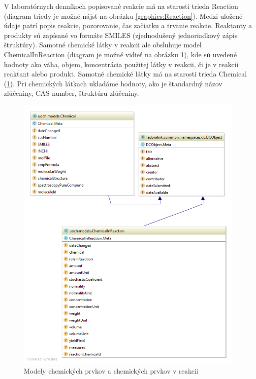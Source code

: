 \documentclass[thesis=M,slovak]{FITthesis}[2013/05/06]
\begin{document}
V laboratórnych denníkoch popisované reakcie má na starosti trieda Reaction (diagram triedy je možné nájsť na obrázku \ref{graphics:Reaction}). Medzi uložené údaje patrí popis reakcie, pozorovanie, čas začiatku a trvanie reakcie. Reaktanty a produkty sú zapísané vo formáte SMILES (zjednodušený jednoriadkový zápis štruktúry). Samotné chemické látky v reakcii ale obsluhuje model ChemicalInReaction (diagram je možné vidieť na obrázku \ref{graphics:Chemical}), kde sú uvedené hodnoty ako váha, objem, koncentrácia použitej látky v reakcii, či je v reakcii reaktant alebo produkt. Samotné chemické látky má na starosti trieda Chemical (\ref{graphics:Chemical}). Pri chemických látkach ukladáme hodnoty, ako je štandardný názov zlúčeniny, CAS number, štruktúru zlúčeniny.

\begin{figure}\centering
	\includegraphics[width=1.0\textwidth]{diagramy/UOCH_Chemical.png}
 	\caption[Modely chemických prvkov a chemických prvkov v reakcii]{Modely chemických prvkov a chemických prvkov v reakcii}\label{graphics:Chemical}
\end{figure}
\end{document}
